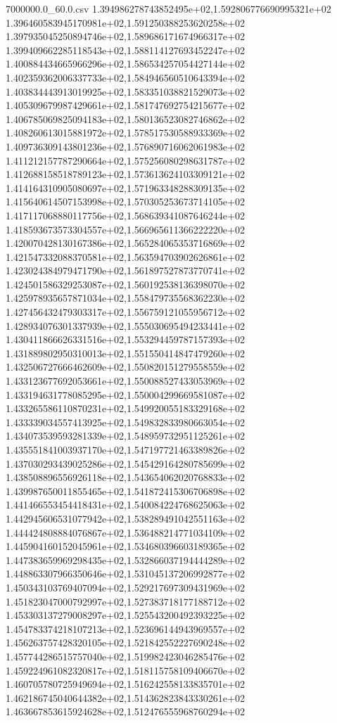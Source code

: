 \begin{filecontents*}{7000000.0_60.0.csv}
1.394986278743852495e+02,1.592806776690995321e+02
1.396460583945170981e+02,1.591250388253620258e+02
1.397935045250894746e+02,1.589686171674966317e+02
1.399409662285118543e+02,1.588114127693452247e+02
1.400884434665966296e+02,1.586534257054427144e+02
1.402359362006337733e+02,1.584946560510643394e+02
1.403834443913019925e+02,1.583351038821529073e+02
1.405309679987429661e+02,1.581747692754215677e+02
1.406785069825094183e+02,1.580136523082746862e+02
1.408260613015881972e+02,1.578517530588933369e+02
1.409736309143801236e+02,1.576890716062061983e+02
1.411212157787290664e+02,1.575256080298631787e+02
1.412688158518789123e+02,1.573613624103309121e+02
1.414164310905080697e+02,1.571963348288309135e+02
1.415640614507153998e+02,1.570305253673714105e+02
1.417117068880117756e+02,1.568639341087646244e+02
1.418593673573304557e+02,1.566965611366222220e+02
1.420070428130167386e+02,1.565284065353716869e+02
1.421547332088370581e+02,1.563594703902626861e+02
1.423024384979471790e+02,1.561897527873770741e+02
1.424501586329253087e+02,1.560192538136398070e+02
1.425978935657871034e+02,1.558479735568362230e+02
1.427456432479303317e+02,1.556759121055956712e+02
1.428934076301337939e+02,1.555030695494233441e+02
1.430411866626331516e+02,1.553294459787157393e+02
1.431889802950310013e+02,1.551550414847479260e+02
1.432506727666462609e+02,1.550820151279558559e+02
1.433123677692053661e+02,1.550088527433053969e+02
1.433194631778085295e+02,1.550004299669581087e+02
1.433265586110870231e+02,1.549920055183329168e+02
1.433339034557413925e+02,1.549832833980663054e+02
1.434073539593281339e+02,1.548959732951125261e+02
1.435551841003937170e+02,1.547197721463389826e+02
1.437030293439025286e+02,1.545429164280785699e+02
1.438508896556926118e+02,1.543654062020768833e+02
1.439987650011855465e+02,1.541872415306706898e+02
1.441466553454418431e+02,1.540084224768625063e+02
1.442945606531077942e+02,1.538289491042551163e+02
1.444424808884076867e+02,1.536488214771034109e+02
1.445904160152045961e+02,1.534680396603189365e+02
1.447383659969298435e+02,1.532866037194444289e+02
1.448863307966350646e+02,1.531045137206992877e+02
1.450343103769407094e+02,1.529217697309431969e+02
1.451823047000792997e+02,1.527383718177188712e+02
1.453303137279008297e+02,1.525543200492393225e+02
1.454783374218107213e+02,1.523696144943969557e+02
1.456263757428320105e+02,1.521842552227690248e+02
1.457744286515757040e+02,1.519982423046285476e+02
1.459224961082320817e+02,1.518115758109406670e+02
1.460705780725949694e+02,1.516242558133835701e+02
1.462186745040644382e+02,1.514362823843330261e+02
1.463667853615924628e+02,1.512476555968760294e+02

\end{filecontents*}
